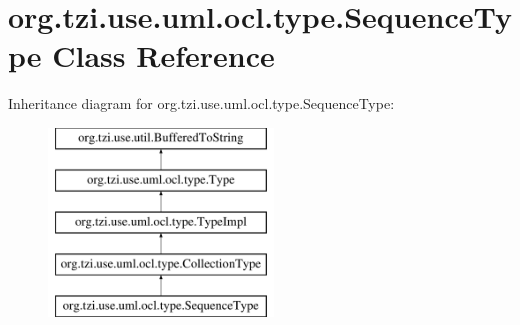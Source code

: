 \hypertarget{classorg_1_1tzi_1_1use_1_1uml_1_1ocl_1_1type_1_1_sequence_type}{\section{org.\-tzi.\-use.\-uml.\-ocl.\-type.\-Sequence\-Type Class Reference}
\label{classorg_1_1tzi_1_1use_1_1uml_1_1ocl_1_1type_1_1_sequence_type}
}
Inheritance diagram for org.\-tzi.\-use.\-uml.\-ocl.\-type.\-Sequence\-Type\-:\begin{figure}[H]
\begin{center}
\leavevmode
\includegraphics[height=5.000000cm]{classorg_1_1tzi_1_1use_1_1uml_1_1ocl_1_1type_1_1_sequence_type}
\end{center}
\end{figure}
